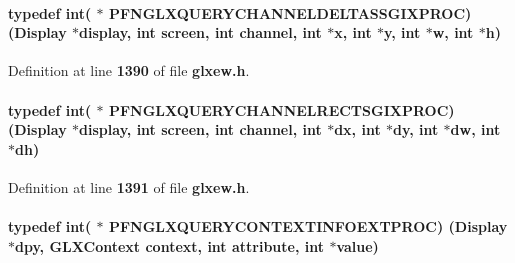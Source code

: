 \paragraph[{P\+F\+N\+G\+L\+X\+Q\+U\+E\+R\+Y\+C\+H\+A\+N\+N\+E\+L\+D\+E\+L\+T\+A\+S\+S\+G\+I\+X\+P\+R\+OC}]{\setlength{\rightskip}{0pt plus 5cm}typedef {\bf int}( $\ast$  P\+F\+N\+G\+L\+X\+Q\+U\+E\+R\+Y\+C\+H\+A\+N\+N\+E\+L\+D\+E\+L\+T\+A\+S\+S\+G\+I\+X\+P\+R\+OC) (Display $\ast$display, {\bf int} screen, {\bf int} channel, {\bf int} $\ast${\bf x}, {\bf int} $\ast${\bf y}, {\bf int} $\ast$w, {\bf int} $\ast$h)}\label{glxew_8h_a5d6ac3fdae7575a99a08236aebe417e6}


Definition at line {\bf 1390} of file {\bf glxew.\+h}.

\paragraph[{P\+F\+N\+G\+L\+X\+Q\+U\+E\+R\+Y\+C\+H\+A\+N\+N\+E\+L\+R\+E\+C\+T\+S\+G\+I\+X\+P\+R\+OC}]{\setlength{\rightskip}{0pt plus 5cm}typedef {\bf int}( $\ast$  P\+F\+N\+G\+L\+X\+Q\+U\+E\+R\+Y\+C\+H\+A\+N\+N\+E\+L\+R\+E\+C\+T\+S\+G\+I\+X\+P\+R\+OC) (Display $\ast$display, {\bf int} screen, {\bf int} channel, {\bf int} $\ast$dx, {\bf int} $\ast$dy, {\bf int} $\ast$dw, {\bf int} $\ast$dh)}\label{glxew_8h_a3cb0333a45d6f824b2a8f2e8a2a2a842}


Definition at line {\bf 1391} of file {\bf glxew.\+h}.

\paragraph[{P\+F\+N\+G\+L\+X\+Q\+U\+E\+R\+Y\+C\+O\+N\+T\+E\+X\+T\+I\+N\+F\+O\+E\+X\+T\+P\+R\+OC}]{\setlength{\rightskip}{0pt plus 5cm}typedef {\bf int}( $\ast$  P\+F\+N\+G\+L\+X\+Q\+U\+E\+R\+Y\+C\+O\+N\+T\+E\+X\+T\+I\+N\+F\+O\+E\+X\+T\+P\+R\+OC) (Display $\ast$dpy, {\bf G\+L\+X\+Context} context, {\bf int} attribute, {\bf int} $\ast$value)}\label{glxew_8h_a2e72e2e4d581898f4b53fa4780735128}


